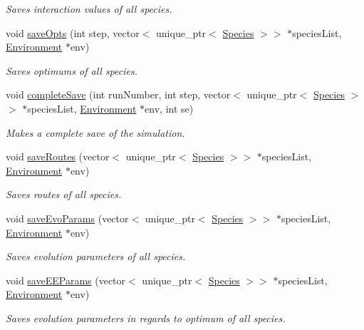 \begin{DoxyCompactItemize}
\begin{DoxyCompactList}\small\item\em Saves interaction values of all species. \end{DoxyCompactList}\item 
void \hyperlink{classSave_a1cea6473b4295efeb65f06895a24f5fb}{save\+Opts} (int step, vector$<$ unique\+\_\+ptr$<$ \hyperlink{classSpecies}{Species} $>$$>$ $\ast$species\+List, \hyperlink{classEnvironment}{Environment} $\ast$env)
\begin{DoxyCompactList}\small\item\em Saves optimums of all species. \end{DoxyCompactList}\item 
void \hyperlink{classSave_a479ae37320e8aaaa98a5636071fb9c59}{complete\+Save} (int run\+Number, int step, vector$<$ unique\+\_\+ptr$<$ \hyperlink{classSpecies}{Species} $>$$>$ $\ast$species\+List, \hyperlink{classEnvironment}{Environment} $\ast$env, int se)
\begin{DoxyCompactList}\small\item\em Makes a complete save of the simulation. \end{DoxyCompactList}\item 
void \hyperlink{classSave_ad66abd97a2e0b7d9dd61cb412cefd01e}{save\+Routes} (vector$<$ unique\+\_\+ptr$<$ \hyperlink{classSpecies}{Species} $>$$>$ $\ast$species\+List, \hyperlink{classEnvironment}{Environment} $\ast$env)
\begin{DoxyCompactList}\small\item\em Saves routes of all species. \end{DoxyCompactList}\item 
void \hyperlink{classSave_a793a85379317ce9e5a08f7155a990fa8}{save\+Evo\+Params} (vector$<$ unique\+\_\+ptr$<$ \hyperlink{classSpecies}{Species} $>$$>$ $\ast$species\+List, \hyperlink{classEnvironment}{Environment} $\ast$env)
\begin{DoxyCompactList}\small\item\em Saves evolution parameters of all species. \end{DoxyCompactList}\item 
void \hyperlink{classSave_a32add352b829b078643bdd1172c18235}{save\+E\+E\+Params} (vector$<$ unique\+\_\+ptr$<$ \hyperlink{classSpecies}{Species} $>$$>$ $\ast$species\+List, \hyperlink{classEnvironment}{Environment} $\ast$env)
\begin{DoxyCompactList}\small\item\em Saves evolution parameters in regards to optimum of all species. \end{DoxyCompactList}\item 
$$
\end{DoxyCompactItemize}

